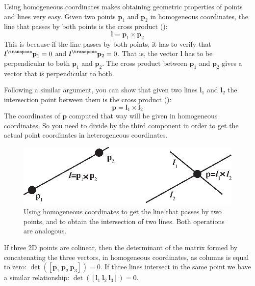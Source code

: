 Using homogeneous coordinates makes obtaining geometric properties of points and lines very easy. Given two points $\mathbf{p}_1$ and $\mathbf{p}_2$ in homogeneous coordinates, the line that passes by both points is the cross product (\fig{\ref{fig:points_and_lines_homogeneous_imggeo}}):
\begin{equation}
    \boldsymbol{l} = \mathbf{p}_1 \times \mathbf{p}_2
\end{equation}
This is because if the line passes by both points, it has to verify that $\boldsymbol{l}^\transpose \mathbf{p}_1=0$ and  $\boldsymbol{l}^\transpose \mathbf{p}_2=0$. That is, the vector $\mathbf{l}$ has to be perpendicular to both $\mathbf{p}_1$ and $\mathbf{p}_2$. The cross product between $\mathbf{p}_1$ and $\mathbf{p}_2$ gives a vector that is perpendicular to both.

Following a similar argument, you can show that given two lines $\boldsymbol{l}_1$ and $\boldsymbol{l}_2$ the intersection point between them is the cross product (\fig{\ref{fig:points_and_lines_homogeneous_imggeo}}):
\begin{equation}
    \mathbf{p} = \boldsymbol{l}_1 \times  \boldsymbol{l}_2
\end{equation}
The coordinates of $\mathbf{p}$ computed that way will be given in homogeneous coordinates. So you need to divide by the third component in order to get the actual point coordinates in heterogeneous coordinates. 

\begin{figure}[t]
\centerline{
\includegraphics[width=.7\linewidth]{figures/imaging_geometry/points_and_lines_homogeneous.eps}
}
\caption{Using homogeneous coordinates to get the line that passes by two points, and to obtain the intersection of two lines. Both operations are analogous.}
\label{fig:points_and_lines_homogeneous_imggeo}
\end{figure}

If three 2D points are colinear, then the determinant of the matrix formed by concatenating the three vectors, in homogeneous coordinates, as columns is equal to zero: $\det( [\mathbf{p}_1~\mathbf{p}_2~\mathbf{p}_3 ])=0$. If three lines intersect in the same point we have a similar relationship: $\det( [\boldsymbol{l}_1~\boldsymbol{l}_2~\boldsymbol{l}_3 ])=0$.

